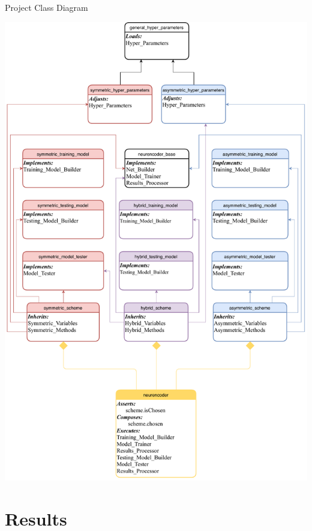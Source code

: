 \documentclass[a4paper, 12pt]{report}
\begin{document}
\begin{blockfigure}{Project Class Diagram}
	\begin{center}
		\includegraphics[width = \textwidth]{classDiagram}
	\end{center}
\end{blockfigure}
\newpage
\chapter{Results}\label{sec:results}
\end{document}

